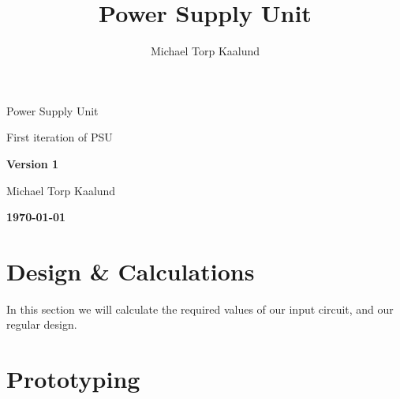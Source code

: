 \documentclass[12pt,a4paper,twoside]{article}
\title{Power Supply Unit}
\author{Michael Torp Kaalund}
\begin{document}
\begin{titlepage}
    \centering
    {\LARGE Power Supply Unit \par}
    \vspace{1cm}
    \vspace{1cm}
    {\Large First iteration of PSU \par}
    \vspace{1.5cm}
    {\huge\bfseries Version 1 \par}
    \vspace{10cm}
    { Michael Torp Kaalund \par}
    \vfill
    {\bfseries \today\par}
\end{titlepage}
\newpage
\tableofcontents

\section{Design \& Calculations}
In this section we will calculate the required values of our input circuit,
and our regular design.
 


\section{Prototyping}

\appendix



\end{document}

